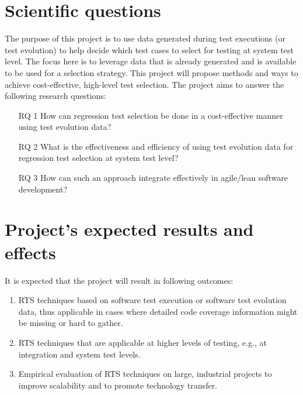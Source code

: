 \documentclass[11pt, oneside]{article}   	%
\begin{document}
\section{Scientific questions}\label{sec:rq}

The purpose of this project is to use data generated during test executions (or test evolution) to help decide which test cases to select for testing at system test level. The focus here is to leverage data that is already generated and is available to be used for a selection strategy. This project will propose methods and ways to achieve cost-effective, high-level test selection. The project aims to answer the following research questions: 

\begin{enumerate}
    \item[RQ 1] How can regression test selection be done in a cost-effective manner using test evolution data?
    \item[RQ 2] What is the effectiveness and efficiency of using test evolution data for regression test selection at system test level? 
    \item[RQ 3] How can such an approach integrate effectively in agile/lean software development?
\end{enumerate} 

\section{Project's expected results and effects}\label{sec:expected_results}
It is expected that the project will result in following outcomes: 
\begin{enumerate}
  \item RTS techniques based on software test execution or software test evolution data, thus applicable in cases where detailed code coverage information might be missing or hard to gather. 
  \item RTS techniques that are applicable at higher levels of testing, e.g., at integration and system test levels.
  \item Empirical evaluation of RTS techniques on large, industrial projects to improve scalability and to promote technology transfer.
\end{enumerate}
\end{document}
